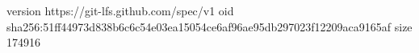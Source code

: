 version https://git-lfs.github.com/spec/v1
oid sha256:51ff44973d838b6c6c54e03ea15054ce6af96ae95db297023f12209aca9165af
size 174916
